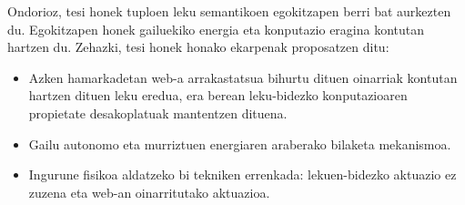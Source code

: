 \begin{laburpena}
Ondorioz, tesi honek tuploen leku semantikoen egokitzapen berri bat aurkezten du. %
Egokitzapen honek gailuekiko energia eta konputazio eragina kontutan hartzen du.
Zehazki, tesi honek honako ekarpenak proposatzen ditu:
\begin{itemize}
   \item Azken hamarkadetan web-a arrakastatsua bihurtu dituen oinarriak kontutan hartzen dituen leku eredua, era berean leku-bidezko konputazioaren propietate desakoplatuak mantentzen dituena.
  \item Gailu autonomo eta murriztuen energiaren araberako bilaketa mekanismoa.
  \item Ingurune fisikoa aldatzeko bi tekniken errenkada: lekuen-bidezko aktuazio ez zuzena eta web-an oinarritutako aktuazioa.
\end{itemize}
\end{laburpena}



